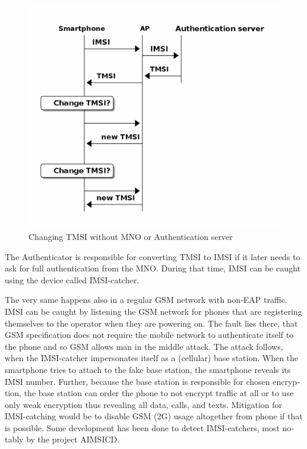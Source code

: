 \documentclass[12pt,a4paper,english]{tutthesis}
\begin{document}
\begin{otherlanguage}{english}
{\begin{figure}[htb]
\centering
\includegraphics[width=.9\linewidth]{imsi-tmsi.png}
\caption{\label{fig:tmsi}Changing TMSI without MNO or Authentication server}
\end{figure}




The Authenticator 
is responsible for converting  TMSI to IMSI if it later needs to 
ask for full authentication from the MNO. During that time,
IMSI can be caught using the device called IMSI-catcher.

The very same happens also in a regular GSM network with non-EAP traffic.
IMSI can be caught by listening the GSM network for phones that are
registering themselves to the operator when they are powering on.
The fault lies there, that GSM specification does not require the
mobile network to authenticate itself to the phone and so GSM allows
man in the middle attack. 
The attack follows, when the IMSI-catcher impersonates itself as a
(cellular) base station.  When the smartphone tries to attach to the fake base
station, the smartphone reveals its IMSI number. Further, because the
base station is responsible for chosen encryption, the base station
can order the phone to not encrypt traffic at all or to use only weak
encryption thus revealing all data, calls, and texts. Mitigation for
IMSI-catching would be to disable GSM (2G) usage altogether from phone
if that is possible\cite{imsi-heise}. Some development has been done to detect 
IMSI-catchers, most notably by the project AIMSICD\cite{aimcid}.


}
\end{otherlanguage}
\end{document}

